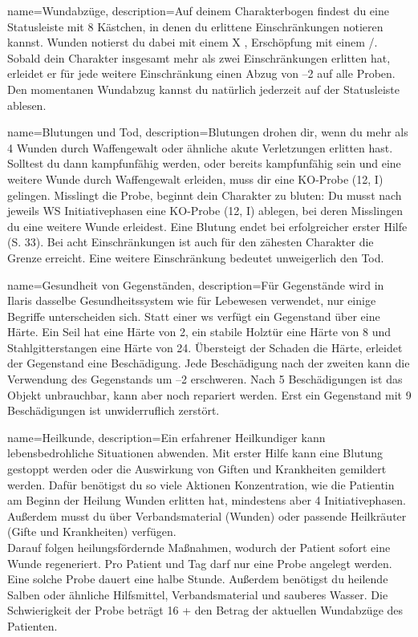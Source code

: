 {
    name={Wundabzüge},
    description={Auf deinem Charakterbogen findest du eine Statusleiste mit 8 Kästchen, in denen du erlittene Einschränkungen notieren kannst. Wunden notierst du dabei mit einem X , Erschöpfung mit einem /. Sobald dein Charakter insgesamt mehr als zwei Einschränkungen erlitten hat, erleidet er für jede weitere Einschränkung einen Abzug von –2 auf alle Proben. Den momentanen Wundabzug kannst du natürlich jederzeit auf der Statusleiste ablesen.}}

{
    name={Blutungen und Tod},
    description={Blutungen drohen dir, wenn du mehr als 4 Wunden durch Waffengewalt oder ähnliche akute Verletzungen erlitten hast. Solltest du dann kampfunfähig werden, oder bereits kampfunfähig sein und eine weitere Wunde durch Waffengewalt erleiden, muss dir eine KO-Probe (12, I) gelingen. Misslingt die Probe, beginnt dein Charakter zu bluten: Du musst nach jeweils WS Initiativephasen eine KO-Probe (12, I) ablegen, bei deren Misslingen du eine weitere Wunde erleidest. Eine Blutung endet bei erfolgreicher erster Hilfe (S. 33). Bei acht Einschränkungen ist auch für den zähesten Charakter die Grenze erreicht. Eine weitere Einschränkung bedeutet unweigerlich den Tod.}}

{
    name={Gesundheit von Gegenständen},
    description={Für Gegenstände wird in Ilaris dasselbe Gesundheitssystem wie für Lebewesen verwendet, nur einige Begriffe unterscheiden sich. Statt einer \gls{ws} verfügt ein Gegenstand über eine Härte. Ein Seil hat eine Härte von 2, ein stabile Holztür eine Härte von 8 und Stahlgitterstangen eine Härte von 24. Übersteigt der Schaden die Härte, erleidet der Gegenstand eine Beschädigung. Jede Beschädigung nach der zweiten kann die Verwendung des Gegenstands um –2 erschweren. Nach 5 Beschädigungen ist das Objekt unbrauchbar, kann aber noch repariert werden. Erst ein Gegenstand mit 9 Beschädigungen ist unwiderruflich zerstört.}}

{
    name={Heilkunde},
    description={Ein erfahrener Heilkundiger kann lebensbedrohliche Situationen abwenden. Mit erster Hilfe kann eine Blutung gestoppt werden oder die Auswirkung von Giften und Krankheiten gemildert werden. Dafür benötigst du so viele Aktionen Konzentration, wie die Patientin am Beginn der Heilung Wunden erlitten hat, mindestens aber 4 Initiativephasen. Außerdem musst du über Verbandsmaterial (Wunden) oder passende Heilkräuter (Gifte und Krankheiten) verfügen.\\
Darauf folgen heilungsfördernde Maßnahmen, wodurch der Patient sofort eine Wunde regeneriert. Pro Patient und Tag darf nur eine Probe angelegt werden. Eine solche Probe dauert eine halbe Stunde. Außerdem benötigst du heilende Salben oder ähnliche Hilfsmittel, Verbands­­material und sauberes Wasser. Die Schwierigkeit der Probe beträgt 16 + den Betrag der aktuellen Wundabzüge des Patienten.}}

